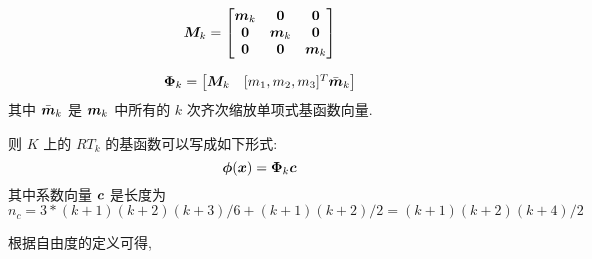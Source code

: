 \documentclass{article}
\begin{document}
$$
{\boldsymbol M}_k = 
    \begin{bmatrix}
        {\boldsymbol m}_{k} & \mathbf 0 & \mathbf 0 \\ 
        \mathbf 0 & {\boldsymbol m}_{k} & \mathbf 0 \\
        \mathbf 0 & \mathbf 0 & {\boldsymbol m}_{k}
    \end{bmatrix} 
$$

$$
{\bm \Phi}_k = 
    \begin{bmatrix}
        {\boldsymbol M}_k & [m_1, m_2, m_3]^T \bar{{\boldsymbol m}}_k\\ 
    \end{bmatrix} 
$$
其中 $\bar{{\boldsymbol m}}_k$ 是 ${\boldsymbol m}_k$ 中所有的 $k$ 次齐次缩放单项式基函数向量.

则 $K$ 上的 $RT_k$ 的基函数可以写成如下形式:
\begin{equation}
    {\bm \phi}({\boldsymbol x}) = {\bm \Phi}_{k}{\boldsymbol c} 
\end{equation}
其中系数向量 ${\boldsymbol c}$ 是长度为
$$
n_c = 3*(k+1)(k+2)(k+3)/6 + (k+1)(k+2)/2 = (k+1)(k+2)(k+4)/2
$$

根据自由度的定义可得, 
\end{document}
